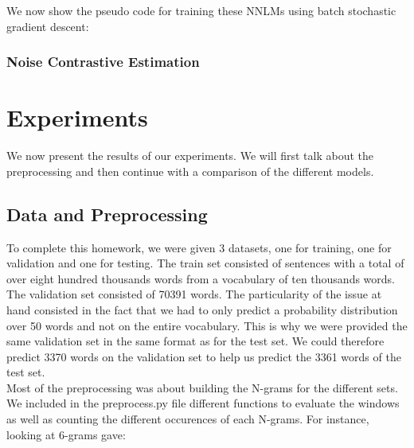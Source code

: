 \documentclass[11pt]{article}
\begin{document}
We now show the pseudo code for training these NNLMs using batch stochastic gradient descent:
  \begin{algorithmic}[1]
    \EndFor{}
    \EndFor{}
    
    \EndFor{}
    \EndProcedure{}
  \end{algorithmic}


\subsubsection{Noise Contrastive Estimation}



\section{Experiments}

We now present the results of our experiments. We will first talk about the preprocessing and then continue with a comparison of the different models.

\subsection{Data and Preprocessing}

To complete this homework, we were given 3 datasets, one for training, one for validation and one for testing. The train set consisted of sentences with a total of over eight hundred thousands words from a vocabulary of ten thousands words. The validation set consisted of 70391 words. The particularity of the issue at hand consisted in the fact that we had to only predict a probability distribution over 50 words and not on the entire vocabulary. This is why we were provided the same validation set in the same format as for the test set. We could therefore predict 3370 words on the validation set to help us predict the 3361 words of the test set.\\

\noindent Most of the preprocessing was about building the N-grams for the different sets. We included in the preprocess.py file different functions to evaluate the windows as well as counting the different occurences of each N-grams. For instance, looking at 6-grams gave:
\end{document}
